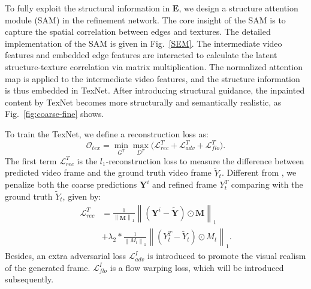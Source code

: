 To fully exploit the structural information in $\boldsymbol{E}$, we design a structure attention module (SAM) in the refinement network.
The core insight of the SAM is to capture the spatial correlation between edges and textures.
The detailed implementation of the SAM is given in Fig.~\ref{SEM}.
The intermediate video features and embedded edge features are interacted to calculate the latent structure-texture correlation via matrix multiplication. 
%
The normalized attention map is applied to the intermediate video features, and the structure information is thus embedded in TexNet.
After introducing structural guidance, the inpainted content by TexNet becomes more structurally and semantically realistic, as Fig.~\ref{fig:coarse-fine} shows.
 


To train the TexNet, we define a reconstruction loss as:
%
\begin{equation}
	\label{eq:1}
		\mathcal{O}_{tex}=\min\limits_{G^T} \max \limits_{D^T} \big(\mathcal{L}^{T}_{rec}+\mathcal{L}^T_{adv}+\mathcal{L}^{T}_{flo}\big).
\end{equation}
%
The first term $\mathcal{L}^{T}_{rec}$ is the $l_1$-reconstruction loss to measure the difference between predicted video frame and the ground truth video frame $\widetilde{Y}_t$.
Different from \cite{nazeri2019edgeconnect}, we penalize both the coarse predictions $\boldsymbol{Y}^i$ and refined frame $Y^{T}_t$ comparing with the ground truth $\widetilde{Y}_t$, given by:
\begin{equation}
	\begin{aligned}
		\mathcal{L}^{T}_{rec}&=\frac{1}{\left\|\boldsymbol{M} \right\|_1}\left\|(\boldsymbol{Y}^i-\widetilde{\boldsymbol{Y}})\odot \boldsymbol{M}\right\|_1\\ &+\lambda_2*\frac{1}{\left\|M_t \right\|_1}\left\|(Y^T_t-\widetilde{Y}_t)\odot M_t\right\|_1.
	\end{aligned}
\end{equation}
%
%
Besides, an extra adversarial loss $\mathcal{L}^I_{adv}$ is introduced to promote the visual realism of the generated frame.
$\mathcal{L}^I_{flo}$ is a flow warping loss, which will be introduced subsequently.




